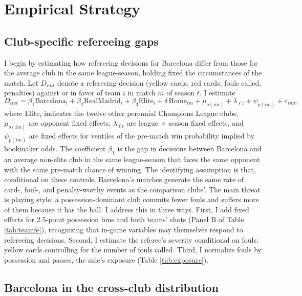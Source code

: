 \section{Empirical Strategy}\label{sec:strategy}

\subsection{Club-specific refereeing gaps}

I begin by estimating how refereeing decisions for Barcelona differ from those for the average club in the same league-season, holding fixed the circumstances of the match. Let $D_{imt}$ denote a refereeing decision (yellow cards, red cards, fouls called, penalties) against or in favor of team $i$ in match $m$ of season $t$. I estimate
\begin{equation}\label{eq:teamfe}
D_{imt} = \beta_1 \text{Barcelona}_i + \beta_2 \text{RealMadrid}_i + \beta_3 \text{Elite}_i + \delta\, \text{Home}_{im} + \mu_{o(im)} + \lambda_{\ell t} + \psi_{p(im)} + \varepsilon_{imt},
\end{equation}
where $\text{Elite}_i$ indicates the twelve other perennial Champions League clubs, $\mu_{o(im)}$ are opponent fixed effects, $\lambda_{\ell t}$ are league $\times$ season fixed effects, and $\psi_{p(im)}$ are fixed effects for ventiles of the pre-match win probability implied by bookmaker odds. The coefficient $\beta_1$ is the gap in decisions between Barcelona and an average non-elite club in the same league-season that faces the same opponent with the same pre-match chance of winning. The identifying assumption is that, conditional on these controls, Barcelona's matches generate the same rate of card-, foul-, and penalty-worthy events as the comparison clubs'. The main threat is playing style: a possession-dominant club commits fewer fouls and suffers more of them because it has the ball. I address this in three ways. First, I add fixed effects for 2.5-point possession bins and both teams' shots (Panel B of Table \ref{tab:teamfe}), recognizing that in-game variables may themselves respond to refereeing decisions. Second, I estimate the referee's severity conditional on fouls: yellow cards controlling for the number of fouls called. Third, I normalize fouls by possession and passes, the side's exposure (Table \ref{tab:exposure}).

\subsection{Barcelona in the cross-club distribution}

